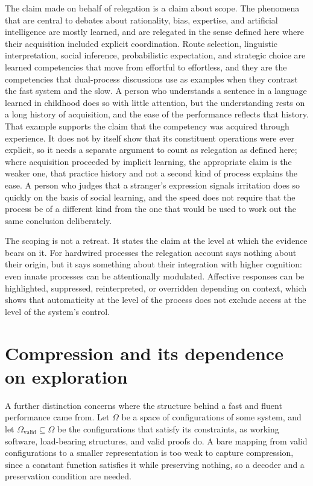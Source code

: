 \documentclass[11pt]{report}
\theoremstyle{remark}
\theoremstyle{definition}
\begin{document}
The claim made on behalf of relegation is a claim about scope. The phenomena that are central to debates about rationality, bias, expertise, and artificial intelligence are mostly learned, and are relegated in the sense defined here where their acquisition included explicit coordination. Route selection, linguistic interpretation, social inference, probabilistic expectation, and strategic choice are learned competencies that move from effortful to effortless, and they are the competencies that dual-process discussions use as examples when they contrast the fast system and the slow. A person who understands a sentence in a language learned in childhood does so with little attention, but the understanding rests on a long history of acquisition, and the ease of the performance reflects that history. That example supports the claim that the competency was acquired through experience. It does not by itself show that its constituent operations were ever explicit, so it needs a separate argument to count as relegation as defined here; where acquisition proceeded by implicit learning, the appropriate claim is the weaker one, that practice history and not a second kind of process explains the ease. A person who judges that a stranger's expression signals irritation does so quickly on the basis of social learning, and the speed does not require that the process be of a different kind from the one that would be used to work out the same conclusion deliberately.

The scoping is not a retreat. It states the claim at the level at which the evidence bears on it. For hardwired processes the relegation account says nothing about their origin, but it says something about their integration with higher cognition: even innate processes can be attentionally modulated. Affective responses can be highlighted, suppressed, reinterpreted, or overridden depending on context, which shows that automaticity at the level of the process does not exclude access at the level of the system's control.

\section{Compression and its dependence on exploration}

A further distinction concerns where the structure behind a fast and fluent performance came from. Let $\Omega$ be a space of configurations of some system, and let $\Omega_{\mathrm{valid}}\subseteq\Omega$ be the configurations that satisfy its constraints, as working software, load-bearing structures, and valid proofs do. A bare mapping from valid configurations to a smaller representation is too weak to capture compression, since a constant function satisfies it while preserving nothing, so a decoder and a preservation condition are needed.
\end{document}
